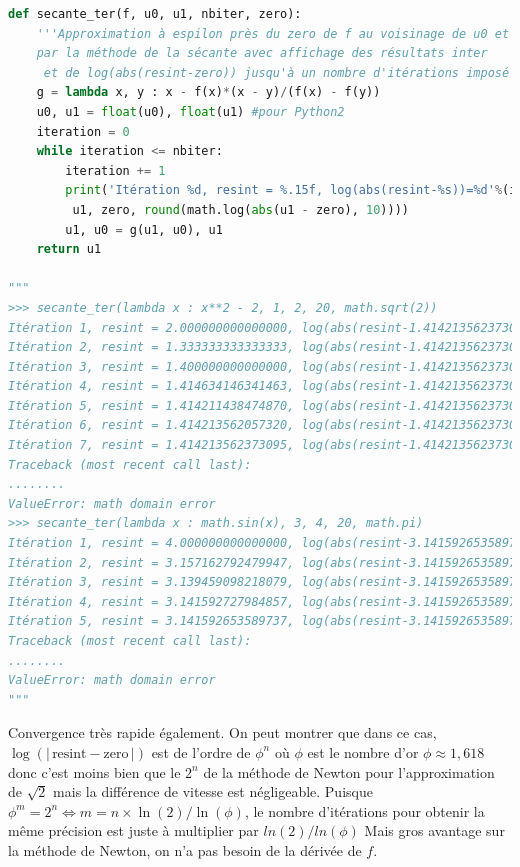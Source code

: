 \documentclass[
  11pt,
]{article}
\newcounter{def}
\begin{document}
\begin{lstlisting}[language=Python]
def secante_ter(f, u0, u1, nbiter, zero):
    '''Approximation à espilon près du zero de f au voisinage de u0 et u1
    par la méthode de la sécante avec affichage des résultats inter
     et de log(abs(resint-zero)) jusqu'à un nombre d'itérations imposé'''
    g = lambda x, y : x - f(x)*(x - y)/(f(x) - f(y))
    u0, u1 = float(u0), float(u1) #pour Python2
    iteration = 0
    while iteration <= nbiter:
        iteration += 1
        print('Itération %d, resint = %.15f, log(abs(resint-%s))=%d'%(iteration,
         u1, zero, round(math.log(abs(u1 - zero), 10))))
        u1, u0 = g(u1, u0), u1
    return u1

"""
>>> secante_ter(lambda x : x**2 - 2, 1, 2, 20, math.sqrt(2))
Itération 1, resint = 2.000000000000000, log(abs(resint-1.4142135623730951)=0
Itération 2, resint = 1.333333333333333, log(abs(resint-1.4142135623730951)=-1
Itération 3, resint = 1.400000000000000, log(abs(resint-1.4142135623730951)=-2
Itération 4, resint = 1.414634146341463, log(abs(resint-1.4142135623730951)=-3
Itération 5, resint = 1.414211438474870, log(abs(resint-1.4142135623730951)=-6
Itération 6, resint = 1.414213562057320, log(abs(resint-1.4142135623730951)=-10
Itération 7, resint = 1.414213562373095, log(abs(resint-1.4142135623730951)=-16
Traceback (most recent call last):
........
ValueError: math domain error
>>> secante_ter(lambda x : math.sin(x), 3, 4, 20, math.pi)
Itération 1, resint = 4.000000000000000, log(abs(resint-3.141592653589793)=0
Itération 2, resint = 3.157162792479947, log(abs(resint-3.141592653589793)=-2
Itération 3, resint = 3.139459098218079, log(abs(resint-3.141592653589793)=-3
Itération 4, resint = 3.141592727984857, log(abs(resint-3.141592653589793)=-7
Itération 5, resint = 3.141592653589737, log(abs(resint-3.141592653589793)=-13
Traceback (most recent call last):
........
ValueError: math domain error
"""
\end{lstlisting}

Convergence très rapide également. On peut montrer que dans ce cas,
\(\log(\vert \, \text{resint}-\text{zero} \, \vert)\) est de l'ordre de
\(\phi^n\) où \(\phi\) est le nombre d'or \(\phi \approx 1,618\) donc
c'est moins bien que le \(2^n\) de la méthode de Newton pour
l'approximation de \(\sqrt{2}\) mais la différence de vitesse est
négligeable. Puisque
\(\phi^m = 2^n \Leftrightarrow m = n\times \ln(2)/\ln(\phi)\), le nombre
d'itérations pour obtenir la même précision est juste à multiplier par
\(ln(2)/ln(\phi)\) Mais gros avantage sur la méthode de Newton, on n'a
pas besoin de la dérivée de \(f\).
\end{document}
